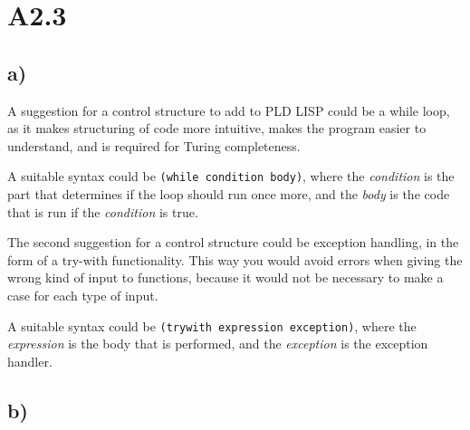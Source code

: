 \section*{A2.3}

\subsection*{a)}
A suggestion for a control structure to add to PLD LISP could be a while loop, as it makes structuring of code more intuitive, makes the program easier to understand, and is required for Turing completeness.

A suitable syntax could be \texttt{(while condition body)}, where the \textit{condition} is the part that determines if the loop should run once more, and the \textit{body} is the code that is run if the \textit{condition} is true.

The second suggestion for a control structure could be exception handling, in the form of a try-with functionality. This way you would avoid errors when giving the wrong kind of input to functions, because it would not be necessary to make a case for each type of input.

A suitable syntax could be \texttt{(trywith expression exception)}, where the \textit{expression} is the body that is performed, and the \textit{exception} is the exception handler.

\subsection*{b)}
